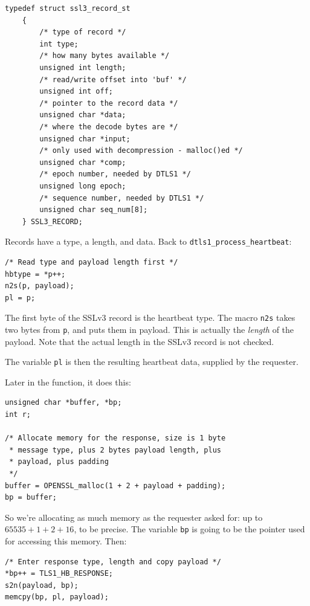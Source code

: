 \documentclass[10pt,twoside,openleft]{memoir}
\begin{document}
{\footnotesize
\begin{verbatim}
typedef struct ssl3_record_st
    {
        /* type of record */
        int type;
        /* how many bytes available */
        unsigned int length;
        /* read/write offset into 'buf' */
        unsigned int off;
        /* pointer to the record data */
        unsigned char *data;
        /* where the decode bytes are */
        unsigned char *input;
        /* only used with decompression - malloc()ed */
        unsigned char *comp;
        /* epoch number, needed by DTLS1 */
        unsigned long epoch;
        /* sequence number, needed by DTLS1 */
        unsigned char seq_num[8];
    } SSL3_RECORD;
\end{verbatim}
}

\noindent Records have a type, a length, and data. Back to \texttt{dtls1\_process\_heartbeat}:

{\footnotesize
\begin{verbatim}
/* Read type and payload length first */
hbtype = *p++;
n2s(p, payload);
pl = p;
\end{verbatim}
}

\noindent The first byte of the SSLv3 record is the heartbeat type. The macro \texttt{n2s} takes two bytes from \texttt{p}, and puts them in payload. This is actually the \textit{length} of the payload. Note that the actual length in the SSLv3 record is not checked.

The variable \texttt{pl} is then the resulting heartbeat data, supplied by the requester.

Later in the function, it does this:

{\footnotesize
\begin{verbatim}
unsigned char *buffer, *bp;
int r;

/* Allocate memory for the response, size is 1 byte
 * message type, plus 2 bytes payload length, plus
 * payload, plus padding
 */
buffer = OPENSSL_malloc(1 + 2 + payload + padding);
bp = buffer;
\end{verbatim}
}

\noindent So we're allocating as much memory as the requester asked for: up to $65535+1+2+16$, to be precise. The variable \texttt{bp} is going to be the pointer used for accessing this memory. Then:

{\footnotesize
\begin{verbatim}
/* Enter response type, length and copy payload */
*bp++ = TLS1_HB_RESPONSE;
s2n(payload, bp);
memcpy(bp, pl, payload);
\end{verbatim}
}
\end{document}
